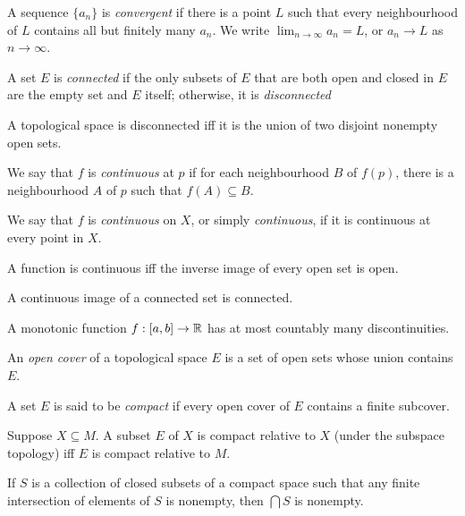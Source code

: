 \begin{defn}
  A sequence $\{a_n\}$ is \emph{convergent} if there is a point $L$ such that
  every neighbourhood of $L$ contains all but finitely many $a_n$.
  We write $\lim_{n\to\infty} a_n=L$, or $a_n\to L$ as $n\to\infty$.
\end{defn}
\begin{defn}
    A set $E$ is \emph{connected} if the only subsets of $E$ that are both open
    and closed in $E$ are the empty set and $E$ itself; otherwise, it is
    \emph{disconnected}
\end{defn}
\begin{prop}
    A topological space is disconnected iff it is the union of two 
    disjoint nonempty open sets.
\end{prop}
\begin{defn}
  We say that $f$ is \emph{continuous} at $p$ if for each neighbourhood $B$ of
  $f(p)$, there is a neighbourhood $A$ of $p$ such that $f(A)\subseteq B$.

  We say that $f$ is \emph{continuous} on $X$, or simply \emph{continuous},
  if it is continuous at every point in $X$.
\end{defn}
\begin{prop}
  A function is continuous iff the inverse image of every open set is open.
\end{prop}
\begin{prop}
    A continuous image of a connected set is connected.
\end{prop}
\begin{prop}
    A monotonic function $f:[a,b]\to\mathbb{R}$ has at most countably many
    discontinuities.
\end{prop}
\begin{defn}
  An \emph{open cover} of a topological space $E$ is a set of open sets whose union contains $E$.
\end{defn}
\begin{defn}
    A set $E$ is said to be \emph{compact} if every open cover of $E$ contains a
    finite subcover.
\end{defn}
\begin{prop}
  Suppose $X\subseteq M$. A subset $E$ of $X$ is compact
  relative to $X$ (under the subspace topology) iff $E$ is compact relative to $M$.
\end{prop}
\begin{prop}
  If $S$ is a collection of closed subsets of a compact space such that any
  finite intersection of elements of $S$ is nonempty, then $\bigcap S$ is
  nonempty.
\end{prop}
